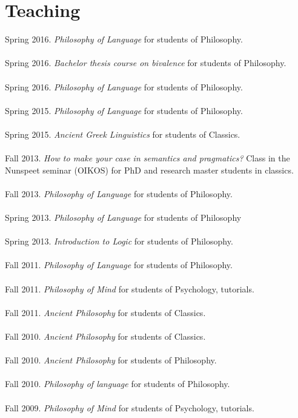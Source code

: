 \documentclass[a4paper,11pt]{article}
\begin{document}
\section*{Teaching}
Spring 2016. \emph{Philosophy of Language} for students of Philosophy.\\\\
Spring 2016. \emph{Bachelor thesis course on bivalence} for students of Philosophy.\\\\
Spring 2016. \emph{Philosophy of Language} for students of Philosophy.\\\\
Spring 2015. \emph{Philosophy of Language} for students of Philosophy.\\\\
Spring 2015. \emph{Ancient Greek Linguistics} for students of Classics.\\\\
Fall 2013. \emph{How to make your case in semantics and pragmatics?} Class in the Nunspeet seminar (OIKOS) for PhD and research master students in classics.\\\\
Fall 2013. \emph{Philosophy of Language} for students of Philosophy.\\\\
Spring 2013. \emph{Philosophy of Language} for students of Philosophy\\\\
Spring 2013. \emph{Introduction to Logic} for students of Philosophy.\\\\
Fall 2011. \emph{Philosophy of Language} for students of Philosophy.\\\\
Fall 2011. \emph{Philosophy of Mind} for students of Psychology, tutorials.\\\\
Fall 2011. \emph{Ancient Philosophy} for students of Classics.\\\\
Fall 2010. \emph{Ancient Philosophy} for students of Classics.\\\\
Fall 2010. \emph{Ancient Philosophy} for students of Philosophy.\\\\
Fall 2010. \emph{Philosophy of language} for students of Philosophy.\\\\
Fall 2009. \emph{Philosophy of Mind} for students of Psychology, tutorials.\\\\
\end{document}
